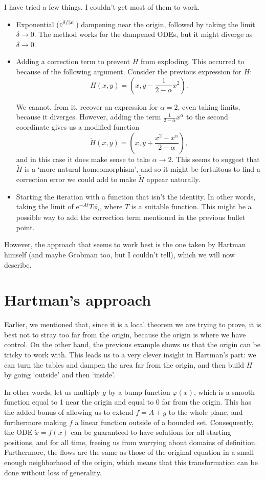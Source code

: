 \documentclass{article}
\newcommand{\e}{\mathrm{e}}
\DeclarePairedDelimiter{\abs}{\lvert}{\rvert}
\begin{document}
I have tried a few things. I couldn't get most of them to work.
\begin{itemize}
\item Exponential ($\e^{\delta/\abs{x}}$) dampening near the origin, followed by taking the limit $\delta \to 0$. The method works for the dampened ODEs, but it might diverge as $\delta \to 0$.

\item Adding a correction term to prevent $H$ from exploding. This occurred to because of the following argument. Consider the previous expression for $H$:
\[H(x,y) = (x,y - \frac1{2-\alpha} x^2).\]

We cannot, from it, recover an expression for $\alpha = 2$, even taking limits, because it diverges. However, adding the term $\frac1{2-\alpha} x^\alpha$ to the second coordinate gives us a modified function
\[\tilde H(x,y) = (x,y + \frac{x^2 - x^\alpha}{2-\alpha}),\]
and in this case it does make sense to take $\alpha \to 2$. This seems to suggest that $\tilde H$ is a `more natural homeomorphism', and so it might be fortuitous to find a correction error we could add to make $\tilde H$ appear naturally.

\item Starting the iteration with a function that isn't the identity. In other words, taking the limit of $\e^{-A t} T \phi_t$, where $T$ is a suitable function. This might be a possible way to add the correction term mentioned in the previous bullet point.
\end{itemize}

However, the approach that seems to work best is the one taken by Hartman himself (and maybe Grobman too, but I couldn't tell), which we will now describe.

\section{Hartman's approach}

Earlier, we mentioned that, since it is a local theorem we are trying to prove, it is best not to stray too far from the origin, because the origin is where we have control. On the other hand, the previous example shows us that the origin can be tricky to work with. This leads us to a very clever insight in Hartman's part: we can turn the tables and dampen the area far from the origin, and then build $H$ by going `outside' and then `inside'.

In other words, let us multiply $g$ by a bump function $\varphi(x)$, which is a smooth function equal to 1 near the origin and equal to 0 far from the origin. This has the added bonus of allowing us to extend $f = A + g$ to the whole plane, and furthermore making $f$ a linear function outside of a bounded set. Consequently, the ODE $\dot x = f(x)$ can be guaranteed to have solutions for all starting positions, and for all time, freeing us from worrying about domains of definition. Furthermore, the flows are the same as those of the original equation in a small enough neighborhood of the origin, which means that this transformation can be done without loss of generality.
\end{document}
